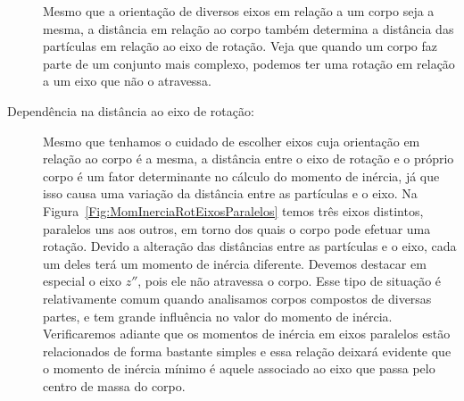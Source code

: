 \begin{description}
\begin{marginfigure}[2cm]
\caption{Mesmo que a orientação de diversos eixos em relação a um corpo seja a mesma, a distância em relação ao corpo também determina a distância das partículas em relação ao eixo de rotação. Veja que quando um corpo faz parte de um conjunto mais complexo, podemos ter uma rotação em relação a um eixo que não o atravessa. \label{Fig:MomInerciaRotEixosParalelos}}
\end{marginfigure}

    \item[Dependência na distância ao eixo de rotação:] Mesmo que tenhamos o cuidado de escolher eixos cuja orientação em relação ao corpo é a mesma, a distância entre o eixo de rotação e o próprio corpo é um fator determinante no cálculo do momento de inércia, já que isso causa uma variação da distância entre as partículas e o eixo. Na Figura~\ref{Fig:MomInerciaRotEixosParalelos} temos três eixos distintos, paralelos uns aos outros, em torno dos quais o corpo pode efetuar uma rotação. Devido a alteração das distâncias entre as partículas e o eixo, cada um deles terá um momento de inércia diferente. Devemos destacar em especial o eixo $z''$, pois ele não atravessa o corpo. Esse tipo de situação é relativamente comum quando analisamos corpos compostos de diversas partes, e tem grande influência no valor do momento de inércia. Verificaremos adiante que os momentos de inércia em eixos paralelos estão relacionados de forma bastante simples e essa relação deixará evidente que o momento de inércia mínimo é aquele associado ao eixo que passa pelo centro de massa do corpo.
    
\begin{marginfigure}[2cm]
\centering
{}
\end{marginfigure}
\end{description}
